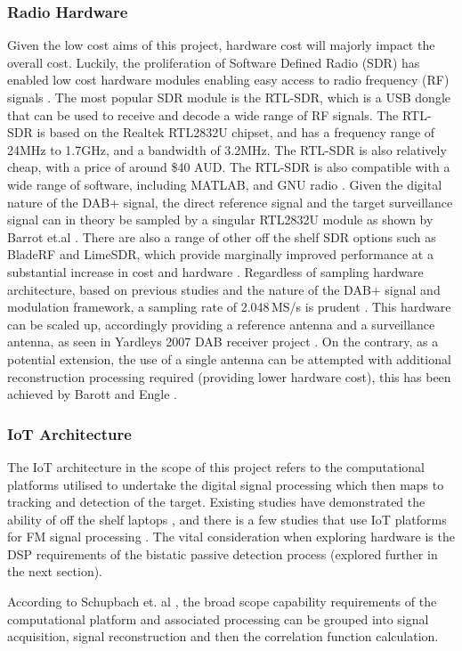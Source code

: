 \documentclass[12pt,a4paper]{article}
\begin{document}
\subsubsection{Radio Hardware}
Given the low cost aims of this project, hardware cost will majorly impact the overall cost. Luckily, the proliferation of Software Defined Radio (SDR) has enabled low cost hardware modules enabling easy access to radio frequency (RF) signals \cite{SDRtheory}. The most popular SDR module is the RTL-SDR, which is a USB dongle that can be used to receive and decode a wide range of RF signals. The RTL-SDR is based on the Realtek RTL2832U chipset, and has a frequency range of 24MHz to 1.7GHz, and a bandwidth of 3.2MHz. The RTL-SDR is also relatively cheap, with a price of around \$40 AUD. The RTL-SDR is also compatible with a wide range of software, including MATLAB, and GNU radio \cite{SDRdongle}. Given the digital nature of the DAB+ signal, the direct reference signal and the target surveillance signal can in theory be sampled by a singular RTL2832U module as shown by Barrot et.al \cite{DABsingleRadar}. There are also a range of other off the shelf SDR options such as BladeRF and LimeSDR, which provide marginally improved performance at a substantial increase in cost and hardware \cite{SDRhardware}.  Regardless of sampling hardware architecture, based on previous studies and the nature of the DAB+ signal and modulation framework, a sampling rate of 2.048\,MS/s is prudent \cite{IOTpassiveRadar}. This hardware can be scaled up, accordingly providing a reference antenna and a surveillance antenna, as seen in Yardleys 2007 DAB receiver project \cite{antennaArchitecture}. On the contrary, as a potential extension, the use of a single antenna can be attempted with additional reconstruction processing required (providing lower hardware cost), this has been achieved by Barott and Engle \cite{DABsingleRadar}.

\subsubsection{IoT Architecture}
The IoT architecture in the scope of this project refers to the computational platforms utilised to undertake the digital signal processing which then maps to tracking and detection of the target. Existing studies have demonstrated the ability of off the shelf laptops \cite{FMlowCost}, and there is a few studies that use IoT platforms for FM signal processing \cite{IOTpassiveRadar}. The vital consideration when exploring hardware is the DSP requirements of the bistatic passive detection process (explored further in the next section).
\par \vspace{0.5cm} 
\noindent According to Schupbach et. al \cite{DABprocessingChain}, the broad scope capability requirements of the computational platform and associated processing can be grouped into signal acquisition, signal reconstruction and then the correlation function calculation. 
    
\end{document}

